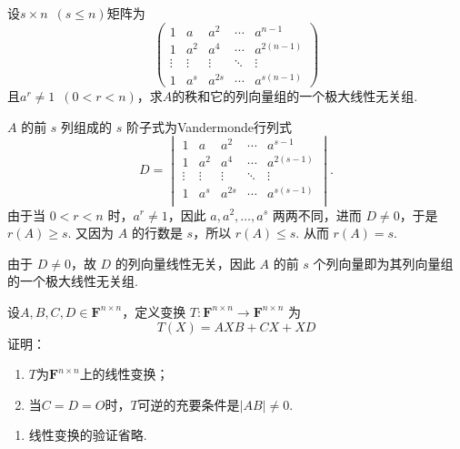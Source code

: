 \begin{exercise}
\begin{exgroup}
        \item 设$s \times n\enspace(s\leqslant n)$矩阵为
        \[\begin{pmatrix}
                1      & a      & a^2    & \cdots & a^{n-1}    \\
                1      & a^2    & a^4    & \cdots & a^{2(n-1)} \\
                \vdots & \vdots & \vdots & \ddots & \vdots     \\
                1      & a^s    & a^{2s} & \cdots & a^{s(n-1)}
            \end{pmatrix}\]
        且$a^r\neq 1\enspace(0<r<n)$，求$A$的秩和它的列向量组的一个极大线性无关组.
        \begin{answer}
            $A$ 的前 $s$ 列组成的 $s$ 阶子式为Vandermonde行列式
            \[D = \begin{vmatrix}
                    1      & a      & a^2    & \cdots & a^{s-1}    \\
                    1      & a^2    & a^4    & \cdots & a^{2(s-1)} \\
                    \vdots & \vdots & \vdots & \ddots & \vdots     \\
                    1      & a^s    & a^{2s} & \cdots & a^{s(s-1)} \\
                \end{vmatrix}.\]
            由于当 $0 < r < n$ 时，$a^r \neq 1$，因此 $a, a^2, \ldots, a^s$ 两两不同，进而 $D \neq 0$，于是 $r(A) \geqslant s$. 又因为 $A$ 的行数是 $s$，所以 $r(A) \leqslant s$. 从而 $r(A) = s$.

            由于 $D \neq 0$，故 $D$ 的列向量线性无关，因此 $A$ 的前 $s$ 个列向量即为其列向量组的一个极大线性无关组.
        \end{answer}

        \item 设$A,B,C,D \in \mathbf{F}^{n \times n}$，定义变换 $ T : \mathbf{F}^{n \times n} \to \mathbf{F}^{n \times n}$ 为
        \[ T(X) = AXB+CX+XD \]
        证明：
        \begin{enumerate}
            \item $T$为$\mathbf{F}^{n \times n}$上的线性变换；

            \item 当$C=D=O$时，$T$可逆的充要条件是$|AB| \neq 0$.
        \end{enumerate}
        \begin{answer}
            \begin{enumerate}
                \item 线性变换的验证省略.


\end{enumerate}
\end{answer}
\end{exgroup}
\end{exercise}

